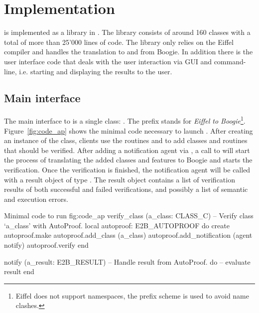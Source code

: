\section{Implementation}
\label{sec:ap-implementation}

\AutoProof is implemented as a library in \EVE. The \AutoProof library consists of around 160 classes with a total of more than 25'000 lines of code.
The \AutoProof library only relies on the Eiffel compiler and handles the translation to and from Boogie. In addition there is the user interface code that deals with the user interaction via GUI and command-line, i.e. starting \AutoProof and displaying the results to the user.


\subsection{Main interface}

The main interface to \AutoProof is a single class: . The prefix  stands for \emph{Eiffel to Boogie}\footnote{Eiffel does not support namespaces, the prefix scheme is used to avoid name clashes.}. Figure~\ref{fig:code_ap} shows the minimal code necessary to launch \AutoProof. After creating an instance of the \AutoProof class, clients use the routines  and  to add classes and routines that should be verified. After adding a notification agent via , a call to  will start the process of translating the added classes and features to Boogie and starts the verification. Once the verification is finished, the notification agent will be called with a result object of type . The result object contains a list of verification results of both successful and failed verifications, and possibly a list of semantic and execution errors.

\begin{efigure}[!htb]{Minimal code to run \AutoProof}{fig:code_ap}
	verify_class (a_class: CLASS_C)
			-- Verify class `a_class' with AutoProof.
		local
			autoproof: E2B_AUTOPROOF
		do
			create autoproof.make
			autoproof.add_class (a_class)
			autoproof.add_notification (agent notify)
			autoproof.verify
		end

	notify (a_result: E2B_RESULT)
			-- Handle result from AutoProof.
		do
			-- evaluate result
		end
\end{efigure}


